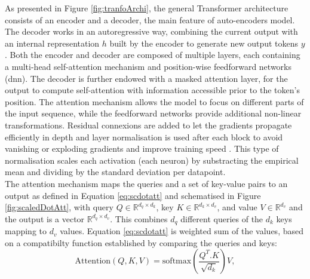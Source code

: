 As presented in Figure \ref{fig:tranfoArchi}, the general Transformer architecture consists of an encoder and a decoder, the main feature of auto-encoders model. The decoder works in an autoregressive way, combining the current output with an internal representation $h$ built by the encoder to generate new output tokens $y$. Both the encoder and decoder are composed of multiple layers, each containing a multi-head self-attention mechanism and position-wise feedforward networks (\gls{dnn}). The decoder is further endowed with a masked attention layer, for the output to compute self-attention with information accessible prior to the token's position. The attention mechanism allows the model to focus on different parts of the input sequence, while the feedforward networks provide additional non-linear transformations. Residual connexions are added to let the gradients propagate efficiently in depth and layer normalisation is used after each block to avoid vanishing or exploding gradients and improve training speed \cite{ba2016layer}. This type of normalisation scales each activation (each neuron) by substracting the empirical mean and dividing by the standard deviation per datapoint. \\
The attention mechanism maps the queries and a set of key-value pairs to an output as defined in Equation \ref{eq:scdotatt} and schematised in Figure \ref{fig:scaledDotAtt}, with query $Q \in \mathbb{R}^{d_q \times d_k}$, key $K \in \mathbb{R}^{d_k \times d_v}$, and value $V \in \mathbb{R}^{d_v}$ and the output is a vector $\mathbb{R}^{d_q \times d_v}$. This combines $d_q$ different queries of the $d_k$ keys mapping to $d_v$ values. Equation \ref{eq:scdotatt} is weighted sum of the values, based on a compatibilty function established by comparing the queries and keys:
\begin{equation}\label{eq:scdotatt}
    \text{Attention}(Q, K, V) = \text{softmax}\left( \frac{Q^T . K}{\sqrt{d_k}}\right) V,
\end{equation} 
